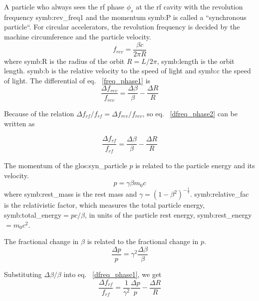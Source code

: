 A particle who always sees the rf phase $\phi_\mathit{s}$ at the rf cavity with the revolution frequency \gls{symb:rev_freq1} and the momentum \gls{symb:P} is called a ``synchronous particle``. For circular accelerators, the revolution frequency is decided by the machine circumference and the particle velocity.
\begin{equation}
f_{\mathit{rev}}=\frac{\beta c}{2\pi R} \label{freq_phase1}
\end{equation}
where \gls{symb:R} is the radius of the orbit $ R=L/2\pi$, \gls{symb:length} is the orbit length. \gls{symb:b} is the relative velocity to the speed of light and \gls{symb:c} the speed of light. The differential of eq. ~\ref{freq_phase1} is
\begin{equation}
\frac{\Delta f_{\mathit{rev}}}{f_{\mathit{rev}}}=\frac{\Delta\beta}{\beta}-\frac{\Delta R}{R} \label{dfreq_phase2}
\end{equation}

Because of the relation $\Delta f_{\mathit{rf}}/f_{\mathit{rf}}=\Delta f_{\mathit{rev}}/f_{\mathit{rev}}$, so eq.~ \ref{dfreq_phase2} can be written as

\begin{equation}
\frac{\Delta f_{\mathit{rf}}}{f_{\mathit{rf}}}=\frac{\Delta\beta}{\beta}-\frac{\Delta R}{R} \label{dfreq_phase1}
\end{equation}

The momentum of the \gls{glos:syn_particle} $p$ is related to the particle energy and its velocity.  
\begin{equation}
p=\gamma \beta m_0c
\end{equation}
where \gls{symb:rest_mass} is the rest mass and $\gamma=(1-\beta^2)^{-\frac{1}{2}}$. \gls{symb:relative_fac} is the relativistic factor, which measures the total particle energy, \gls{symb:total_energy}$=pc/\beta$, in units of the particle rest energy, \gls{symb:rest_energy}$=m_0c^2$. 


The fractional change in $\beta$ is related to the fractional change in $p$.
\begin{equation}
\label{eq:pv}
\frac{\Delta p}{p}=\gamma^2\frac{\Delta \beta}{\beta}
\end{equation}

Substituting $\Delta \beta/\beta$ into eq. ~\ref{dfreq_phase1}, we get 
\begin{equation}
\frac{\Delta f_{\mathit{rf}}}{f_{\mathit{rf}}}=\frac{1}{\gamma^2}\frac{\Delta p}{p}-\frac{\Delta R}{R}\label{f_p_r1}
\end{equation} 

